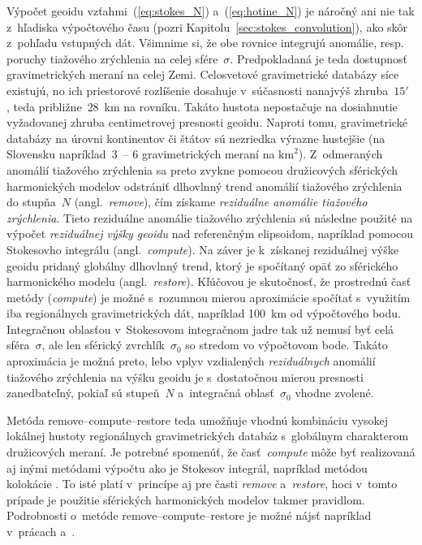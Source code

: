\documentclass[a4paper,12pt]{book}
\begin{document}
Výpočet geoidu vzťahmi~(\ref{eq:stokes_N}) a~(\ref{eq:hotine_N}) je náročný ani 
nie tak z~hľadiska výpočtového času (pozri 
Kapitolu~\ref{sec:stokes_convolution}), ako skôr z~pohľadu vstupných dát.  
Všimnime si, že obe rovnice integrujú anomálie, resp. poruchy tiažového 
zrýchlenia na celej sfére~$\sigma$.  Predpokladaná je teda dostupnosť 
gravimetrických meraní na celej Zemi.  Celosvetové gravimetrické databázy síce 
existujú, no ich priestorové rozlíšenie dosahuje v~súčasnosti nanajvýš 
zhruba~$15'$ \parencite{EGM2008,Pail2018}, teda približne~$28$~km na rovníku.  
Takáto hustota nepostačuje na dosiahnutie vyžadovanej zhruba centimetrovej 
presnosti geoidu.  Naproti tomu, gravimetrické databázy na úrovni kontinentov 
či štátov sú nezriedka výrazne hustejšie (na Slovensku napríklad~3~-- 
6 gravimetrických meraní na $\textrm{km}^2$).  Z~odmeraných anomálií tiažového 
zrýchlenia sa preto zvykne pomocou družicových sférických harmonických modelov 
odstrániť dlhovlnný trend anomálií tiažového zrýchlenia do stupňa~$N$ 
(angl.~\emph{remove}), čím získame \emph{reziduálne anomálie tiažového 
zrýchlenia}.  Tieto reziduálne anomálie tiažového zrýchlenia sú následne 
použité na výpočet \emph{reziduálnej výšky geoidu} nad referenčným elipsoidom, 
napríklad pomocou Stokesovho integrálu (angl.~\emph{compute}).  Na záver je 
k~získanej reziduálnej výške geoidu pridaný globálny dlhovlnný trend, ktorý je 
spočítaný opäť zo sférického harmonického modelu (angl.~\emph{restore}).  
Kľúčovou je skutočnosť, že prostrednú časť metódy (\emph{compute}) je možné 
s~rozumnou mierou aproximácie spočítať s~využitím iba regionálnych 
gravimetrických dát, napríklad 100~km od výpočtového bodu.  Integračnou 
oblasťou v~Stokesovom integračnom jadre tak už nemusí byť celá sféra~$\sigma$, 
ale len sférický zvrchlík~$\sigma_0$ so stredom vo výpočtovom bode.  Takáto 
aproximácia je možná preto, lebo vplyv vzdialených \emph{reziduálnych} anomálií 
tiažového zrýchlenia na výšku geoidu je s~dostatočnou mierou presnosti 
zanedbateľný, pokiaľ sú stupeň~$N$ a~integračná oblasť~$\sigma_0$ vhodne 
zvolené.

Metóda remove--compute--restore teda umožňuje vhodnú kombináciu vysokej 
lokálnej hustoty regionálnych gravimetrických databáz s~globálnym charakterom 
družicových meraní.  Je potrebné spomenúť, že časť~\emph{compute} môže byť 
realizovaná aj inými metódami výpočtu ako je Stokesov integrál, napríklad 
metódou kolokácie \parencite{MoritzAdvancedGeodesy,MoritzPhysicalGeodesy}.  To 
isté platí v~princípe aj pre časti \emph{remove} a~\emph{restore}, hoci v~tomto 
prípade je použitie sférických harmonických modelov takmer pravidlom.  
Podrobnosti o~metóde remove--compute--restore je možné nájsť napríklad 
v~prácach \textcite{Sjoberg2005} a~\textcite{MoritzPhysicalGeodesy}.
\end{document}

